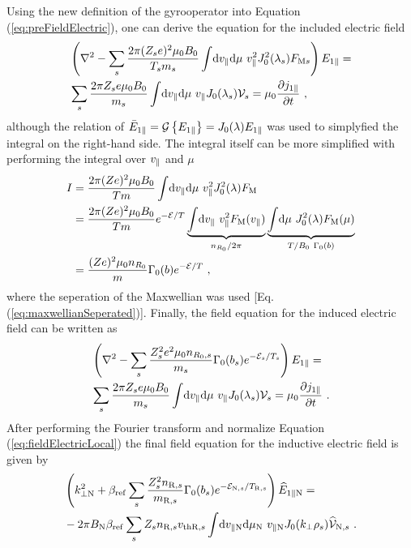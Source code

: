 Using the new definition of the gyrooperator into Equation (\ref{eq:preFieldElectric}), one can derive the equation for the included electric field 
\begin{gather}
    \begin{aligned}
        &\left(\nabla^2 - \sum_s \frac{2\pi (Z_se)^2 \mu_0 B_0}{T_sm_s}  \int \! \mathrm{d}v_\parallel\mathrm{d}\mu ~ v_\parallel^2 J_0^2(\lambda_s) F_{\mathrm{M}s} \right) E_{1\parallel} = \\
	    &\sum_s \frac{2\pi Z_se \mu_0 B_0}{m_s}  \int \! \mathrm{d}v_\parallel\mathrm{d}\mu ~ v_\parallel J_0(\lambda_s) \mathcal{V}_s = \mu_0 \frac{\partial j_{1\parallel}}{\partial t}~,
    \end{aligned}
	\label{eq:prefieldElectricLocal}
\end{gather}
although the relation of $\bar{E}_{1\parallel} = \mathcal{G} \left\{E_{1\parallel}\right\} = J_0(\lambda) E_{1\parallel}$ was used to simplyfied the integral on the right-hand side. The integral itself can be more simplified with performing the integral over $v_\parallel$ and $\mu$
\begin{gather}
	\begin{aligned}
		I &= \frac{2\pi (Ze)^2 \mu_0 B_0}{Tm}  \int \! \mathrm{d}v_\parallel\mathrm{d}\mu ~ v_\parallel^2 J_0^2(\lambda) F_\mathrm{M} \\
		  &= \frac{2\pi (Ze)^2 \mu_0 B_0}{Tm} e^{-\mathcal{E}/T} \underbrace{\int \! \mathrm{d}v_\parallel ~ v_\parallel^2 F_\mathrm{M}(v_\parallel)}_{n_{R_0}/2\pi} \underbrace{\int \! \mathrm{d}\mu ~ J_0^2(\lambda) F_\mathrm{M}(\mu)}_{T/B_0~\Gamma_0(b)} \\
		  &= \frac{(Ze)^2 \mu_0 n_{R_0}}{m} \Gamma_0(b) e^{-\mathcal{E}/T} ~,
	\end{aligned}
\end{gather}
where the seperation of the Maxwellian was used [Eq. (\ref{eq:maxwellianSeperated})]. Finally, the field equation for the induced electric field can be written as
\begin{gather}
    \begin{aligned}
        &\left(\nabla^2 - \sum_s \frac{Z_s^2e^2 \mu_0 n_{R_0,s}}{m_s} \Gamma_0(b_s) e^{-\mathcal{E}_s/T_s} \right) E_{1\parallel} = \\
	    &\sum_s \frac{2\pi Z_se \mu_0 B_0}{m_s}  \int \! \mathrm{d}v_\parallel\mathrm{d}\mu ~ v_\parallel J_0(\lambda_s) \mathcal{V}_s = \mu_0 \frac{\partial j_{1\parallel}}{\partial t}~.
    \end{aligned}
	\label{eq:fieldElectricLocal}
\end{gather}
After performing the Fourier transform and normalize Equation (\ref{eq:fieldElectricLocal}) the final field equation for the inductive electric field is given by
\begin{gather}
    \begin{aligned}
        &\left(k_{\perp \mathrm{N}}^2 + \beta_\mathrm{ref} \sum_s \frac{Z^2_sn_{\mathrm{R},s}}{m_{\mathrm{R},s}} \Gamma_0(b_s) e^{-\mathcal{E}_{\mathrm{N},s}/T_{\mathrm{R},s}} \right) \widehat{E}_{1\parallel \mathrm{N}} = \\
        &- 2\pi B_\mathrm{N} \beta_\mathrm{ref} \sum_s Z_s n_{\mathrm{R},s} v_{\mathrm{th}\mathrm{R},s} \int \! \mathrm{d}v_{\parallel \mathrm{N}} \mathrm{d}\mu_\mathrm{N} ~ v_{\parallel \mathrm{N}} J_0(k_\perp \rho_s) \widehat{\mathcal{V}}_{\mathrm{N},s} ~.
    \end{aligned}
    \label{eq:fieldElectricLocalNorm}
\end{gather}
\newpage